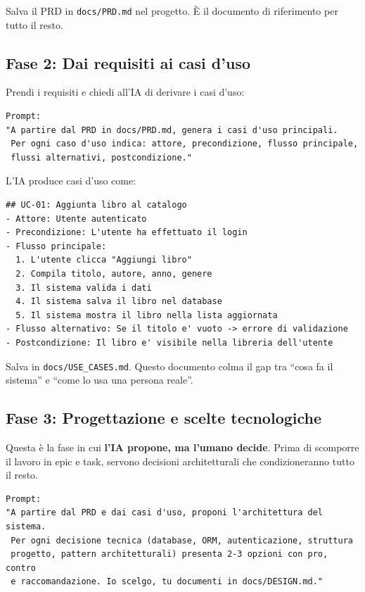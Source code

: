 \begin{tipbox}
Salva il PRD in \texttt{docs/PRD.md} nel progetto. È il documento di riferimento per tutto il resto.
\end{tipbox}

\subsection{Fase 2: Dai requisiti ai casi d'uso}

Prendi i requisiti e chiedi all'IA di derivare i casi d'uso:

\begin{lstlisting}[language={}]
Prompt:
"A partire dal PRD in docs/PRD.md, genera i casi d'uso principali.
 Per ogni caso d'uso indica: attore, precondizione, flusso principale,
 flussi alternativi, postcondizione."
\end{lstlisting}

L'IA produce casi d'uso come:

\begin{lstlisting}[language={}]
## UC-01: Aggiunta libro al catalogo
- Attore: Utente autenticato
- Precondizione: L'utente ha effettuato il login
- Flusso principale:
  1. L'utente clicca "Aggiungi libro"
  2. Compila titolo, autore, anno, genere
  3. Il sistema valida i dati
  4. Il sistema salva il libro nel database
  5. Il sistema mostra il libro nella lista aggiornata
- Flusso alternativo: Se il titolo e' vuoto -> errore di validazione
- Postcondizione: Il libro e' visibile nella libreria dell'utente
\end{lstlisting}

Salva in \texttt{docs/USE\_CASES.md}. Questo documento colma il gap tra ``cosa fa il sistema'' e ``come lo usa una persona reale''.

\subsection{Fase 3: Progettazione e scelte tecnologiche}

Questa è la fase in cui \textbf{l'IA propone, ma l'umano decide}. Prima di scomporre il lavoro in epic e task, servono decisioni architetturali che condizioneranno tutto il resto.

\begin{lstlisting}[language={}]
Prompt:
"A partire dal PRD e dai casi d'uso, proponi l'architettura del sistema.
 Per ogni decisione tecnica (database, ORM, autenticazione, struttura
 progetto, pattern architetturali) presenta 2-3 opzioni con pro, contro
 e raccomandazione. Io scelgo, tu documenti in docs/DESIGN.md."
\end{lstlisting}

